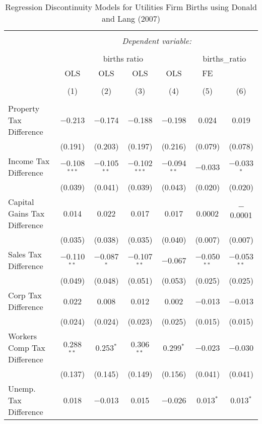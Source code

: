 
\begin{table}[!htbp] \centering 
  \caption{Regression Discontinuity Models for  Utilities Firm Births using Donald and Lang (2007)} 
  \label{} 
\begin{tabular}{@{\extracolsep{5pt}}lcccccc} 
\\[-1.8ex]\hline 
\hline \\[-1.8ex] 
 & \multicolumn{6}{c}{\textit{Dependent variable:}} \\ 
\cline{2-7} 
\\[-1.8ex] & \multicolumn{4}{c}{births ratio} & \multicolumn{2}{c}{births\_ratio} \\ 
 & OLS & OLS & OLS & OLS & FE &  \\ 
\\[-1.8ex] & (1) & (2) & (3) & (4) & (5) & (6)\\ 
\hline \\[-1.8ex] 
 Property Tax Difference & $-$0.213 & $-$0.174 & $-$0.188 & $-$0.198 & 0.024 & 0.019 \\ 
  & (0.191) & (0.203) & (0.197) & (0.216) & (0.079) & (0.078) \\ 
  Income Tax Difference & $-$0.108$^{***}$ & $-$0.105$^{**}$ & $-$0.102$^{***}$ & $-$0.094$^{**}$ & $-$0.033 & $-$0.033$^{*}$ \\ 
  & (0.039) & (0.041) & (0.039) & (0.043) & (0.020) & (0.020) \\ 
  Capital Gains Tax Difference & 0.014 & 0.022 & 0.017 & 0.017 & 0.0002 & $-$0.0001 \\ 
  & (0.035) & (0.038) & (0.035) & (0.040) & (0.007) & (0.007) \\ 
  Sales Tax Difference & $-$0.110$^{**}$ & $-$0.087$^{*}$ & $-$0.107$^{**}$ & $-$0.067 & $-$0.050$^{**}$ & $-$0.053$^{**}$ \\ 
  & (0.049) & (0.048) & (0.051) & (0.053) & (0.025) & (0.025) \\ 
  Corp Tax Difference & 0.022 & 0.008 & 0.012 & 0.002 & $-$0.013 & $-$0.013 \\ 
  & (0.024) & (0.024) & (0.023) & (0.025) & (0.015) & (0.015) \\ 
  Workers Comp Tax Difference & 0.288$^{**}$ & 0.253$^{*}$ & 0.306$^{**}$ & 0.299$^{*}$ & $-$0.023 & $-$0.030 \\ 
  & (0.137) & (0.145) & (0.149) & (0.156) & (0.041) & (0.041) \\ 
  Unemp. Tax Difference & 0.018 & $-$0.013 & 0.015 & $-$0.026 & 0.013$^{*}$ & 0.013$^{*}$ \\ 

\end{tabular}
\end{table}
